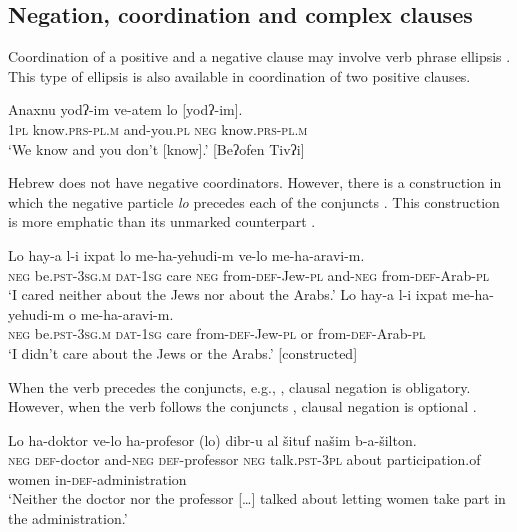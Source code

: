 \documentclass[output=paper,colorlinks,citecolor=brown]{langscibook}
\begin{document}
\subsection{Negation, coordination and complex clauses} \label{sec:heb:4.5}

Coordination of a positive and a negative clause may involve verb phrase ellipsis . This type of ellipsis is also available in coordination of two positive clauses.

\ea\label{ex:heb:43}
    \gll Anaxnu yodʔ{}-im ve-atem lo [yodʔ{}-im]. \\
        1\textsc{pl} know.\textsc{prs-pl.m} and-you.\textsc{pl} \textsc{neg} know.\textsc{prs-pl.m} \\
    \glt ‘We know and you don’t [know].’ [Beʔofen Tivʔi]
\z 

Hebrew does not have negative coordinators. However, there is a construction in which the negative particle \textit{lo} precedes each of the conjuncts . This construction is more emphatic than its unmarked counterpart .

\ea\label{ex:heb:44}
    \ea\label{ex:heb:44a}
        \gll Lo hay-a l-i ixpat lo me-ha-yehudi-m ve-lo me-ha-aravi-m. \\
            \textsc{neg} be.\textsc{pst-3sg.m} \textsc{dat-1sg} care \textsc{neg} from-\textsc{def}{}-Jew-\textsc{pl} and-\textsc{neg} from-\textsc{def}{}-Arab-\textsc{pl}\\
        \glt ‘I cared neither about the Jews nor about the Arabs.’ \citep[353]{Tzivoni1993}
    \ex\label{ex:heb:44b}
        \gll Lo hay-a l-i ixpat me-ha-yehudi-m o me-ha-aravi-m.\\
            \textsc{neg} be.\textsc{pst-3sg.m} \textsc{dat-1sg} care from-\textsc{def}{}-Jew-\textsc{pl} or from-\textsc{def}{}-Arab-\textsc{pl}\\
        \glt ‘I didn’t care about the Jews or the Arabs.’ [constructed]
    \z 
\z

When the verb precedes the conjuncts, e.g., , clausal negation is obligatory. However, when the verb follows the conjuncts , clausal negation is optional \citep[354]{Tzivoni1993}.

\ea\label{ex:heb:45}
    \gll Lo ha-doktor ve-lo ha-profesor (lo) dibr-u al šituf našim b-a-šilton.\\
        \textsc{neg} \textsc{def}{}-doctor and-\textsc{neg} \textsc{def}{}-professor \textsc{neg} talk.\textsc{pst-3pl} about participation.of women in-\textsc{def}{}-administration\\
    \glt ‘Neither the doctor nor the professor […] talked about letting women take part in the administration.’ \citep[354]{Tzivoni1993}
\z 
\end{document}
